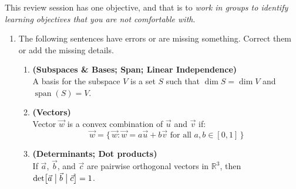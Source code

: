\documentclass[red]{tutorial}
\newcommand{\R}{\mathbb{R}}
\newcommand{\mute}[1]{}
\DeclareMathOperator{\Span} {span}
\theoremstyle{definition}
\theoremstyle{theorem}
\begin{document}
\begin{tutorial}
  \begin{objectives}
    This review session has one objective, and that is to
    \emph{work in groups to identify learning objectives that you
    are not comfortable with}.
  \end{objectives}
  \begin{enumerate}
    \item\label{q:mistake}
      The following sentences have errors or are missing something. Correct
      them or add the missing details.
      \begin{enumerate}
          \mute{
        \item \textbf{(Linear Transformations)}\\
          A transformation $f\colon\R^n\to \R^m$ is linear if
          it sends sums to sums, $f(\vec0) = \vec0$, and
          $f(\alpha \vec x) = \alpha f(\vec x)$.
        \item
          An $n\times m$ matrix corresponds to a linear
          transformation from $\R^n$
          to $\R^m$.
        }
        \item \textbf{(Subspaces \& Bases; Span; Linear Independence)}\\
          A basis for the subspace $V$ is a set $S$
          such that $\dim S = \dim V$ and $\Span(S) = V$.
        \item \textbf{(Vectors)}\\
          Vector $\vec w$ is a convex combination of $\vec u$ and $\vec v$ if:
          \begin{equation*}
            \vec w =
            \bigl\{\,\vec w:\vec w = a\vec u %
            +b\vec v \text{ for all } a,b\in [0,1]\,
            \bigr\}
          \end{equation*}
        \item \textbf{(Determinants; Dot products)} \\
          If $\vec a$, $\vec b$, and $\vec c$ are pairwise orthogonal
          vectors in $\R^3$, then
          $\det \bigl[\vec a\bigm|\vec b\bigm|\vec c\bigr] = 1$.

\end{enumerate}
\end{enumerate}
\end{tutorial}
\end{document}

